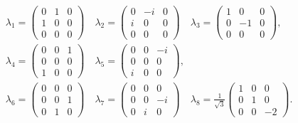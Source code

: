 \begin{align}
  &\lambda_1 = \begin{pmatrix} 0 & 1 & 0 \\ 1 & 0 & 0 \\ 0 & 0 & 0 \end{pmatrix}
  \quad
  \lambda_2 = \begin{pmatrix} 0 & -i & 0 \\ i & 0 & 0 \\ 0 & 0 & 0 \end{pmatrix}
  \quad
  \lambda_3 = \begin{pmatrix} 1 & 0 & 0 \\ 0 & -1& 0 \\ 0 & 0 & 0 \end{pmatrix}
  , \nonumber \\
  &\lambda_4 = \begin{pmatrix} 0 & 0 & 1 \\ 0 & 0 & 0 \\ 1 & 0 & 0 \end{pmatrix}
  \quad
  \lambda_5 = \begin{pmatrix} 0 & 0 & -i\\ 0 & 0 & 0 \\ i & 0 & 0 \end{pmatrix}
  , \label{eq:GellMannMatrices} \\
  &\lambda_6 = \begin{pmatrix} 0 & 0 & 0 \\ 0 & 0 & 1 \\ 0 & 1 & 0 \end{pmatrix}
  \quad
  \lambda_7 = \begin{pmatrix} 0 & 0 & 0 \\ 0 & 0 & -i\\ 0 & i & 0 \end{pmatrix}
  \quad
  \lambda_8 = \frac{1}{\sqrt{3}} \begin{pmatrix} 1 & 0 & 0 \\ 0 & 1 & 0 \\ 
                                                              0 & 0 & -2 \end{pmatrix}.
  \nonumber
\end{align}

